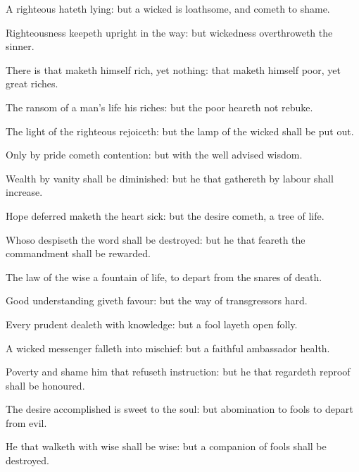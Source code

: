{A
righteous
{}
hateth
lying: but a
wicked
{} is
loathsome, and cometh to
shame.

Righteousness
keepeth
{}
upright in the
way: but
wickedness
overthroweth the
sinner.

There
is that maketh himself
rich, yet
{} nothing:
{} that maketh himself
poor,
yet
{}
great
riches.

The
ransom of a
man’s
life
{} his
riches: but the
poor
heareth not
rebuke.

The
light of the
righteous
rejoiceth: but the
lamp of the
wicked shall be put
out.

Only by
pride
cometh
contention: but with the well
advised
{}
wisdom.

Wealth
{} by
vanity shall be
diminished: but he that
gathereth by
labour shall
increase.

Hope
deferred maketh the
heart
sick: but
{} the
desire
cometh,
{} a
tree of
life.

Whoso
despiseth the
word shall be
destroyed: but he that
feareth the
commandment shall be
rewarded.

The
law of the
wise
{} a
fountain of
life, to
depart from the
snares of
death.

Good
understanding
giveth
favour: but the
way of
transgressors
{}
hard.

Every
prudent
{}
dealeth with
knowledge: but a
fool layeth
open
{}
folly.

A
wicked
messenger
falleth into
mischief: but a
faithful
ambassador
{}
health.

Poverty and
shame
{} him that
refuseth
instruction: but he that
regardeth
reproof shall be
honoured.

The
desire
accomplished is
sweet to the
soul: but
{}
abomination to
fools to
depart from
evil.

He that
walketh with
wise
{} shall be
wise: but a
companion of
fools shall be
destroyed.

}
